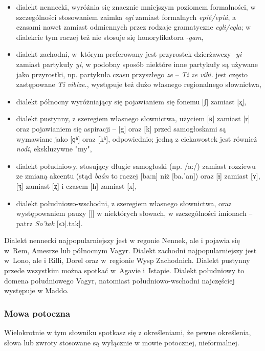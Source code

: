 \begin{spacing}{1.1}
\begin{itemize}
    \item dialekt nennecki, wyróżnia się znacznie mniejszym poziomem
    formalności, w szczególności stosowaniem zaimka \emph{egi} zamiast
    formalnych \emph{epié/epiá}, a czasami nawet zamiast odmiennych przez
    rodzaje gramatyczne \emph{egli/egla}; w dialekcie tym raczej też nie stosuje
    się honoryfikatora \emph{-gam},
    \item dialekt zachodni, w~którym preferowany jest przyrostek dzierżawczy
    \emph{-yi} zamiast partykuły \emph{yi}, w podobny sposób niektóre inne
    partykuły są używane jako przyrostki, np. partykuła czasu przyszłego
    \emph{ze} -- \emph{Ti ze vibi.} jest często zastępowane \emph{Ti vibize.},
    występuje też dużo własnego regionalnego słownictwa,
    \item dialekt północny wyróżniający się pojawianiem się fonemu [ʃ] zamiast
    [ʐ],
    \item dialekt pustynny, z szeregiem własnego słownictwa, użyciem [ʁ] zamiast
    [r] oraz pojawianiem się aspiracji -- [g] oraz [k] przed samogłoskami są
    wymawiane jako [ɡʱ] oraz [kʱ], odpowiednio; jedną z ciekawostek jest również
    \emph{nodi}, ekskluzywne "my",
    \item dialekt południowy, stosujący długie samogłoski (np. /a:/) zamiast
    rozziewu ze zmianą akcentu (stąd \emph{baán} to raczej [ba:n] niż [ba.ˈan])
    oraz [ɨ] zamiast [ʏ], [ʒ] zamiast [ʐ] i czasem [h] zamiast [x],
    \item dialekt południowo-wschodni, z szeregiem własnego słownictwa, oraz
    występowaniem pauzy [|] w niektórych słowach, w szczególności imionach --
    patrz \emph{So'tak} [sɔ|.tak].
\end{itemize}

Dialekt nennecki najpopularniejszy jest w regonie Nennek, ale i pojawia się
w~Rem, Amesrze lub północnym Vagyr. Dialekt zachodni najpopularniejszy jest
w~Lono, ale i Rilli, Dorel oraz w~regionie Wysp Zachodnich. Dialekt pustynny
przede wszystkim można spotkać w~Agavie i~Istapie. Dialekt południowy to domena
południowego Vagyr, natomiast południowo-wschodni najczęściej występuje w Maddo.

\subsubsection{Mowa potoczna}

Wielokrotnie w tym słowniku spotkasz się z określeniami, że pewne określenia,
słowa lub zwroty stosowane są wyłącznie w mowie potocznej, nieformalnej.


\end{spacing}
